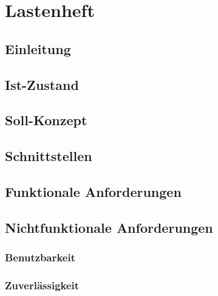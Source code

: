 \documentclass[a4paper,12pt]{article}
\title{\projektName}
\author{\authorName}
\date{\today}
\begin{document}
    
    \setcounter{page}{2}
    \setcounter{tocdepth}{4}
    \setcounter{secnumdepth}{4}
    \tableofcontents
    \clearpage
 
	\begin{abstract}
		Abstrakte Beschreibung.
	\end{abstract}	
	\clearpage
 
	\section{Lastenheft}
 	
		\subsection{Einleitung} %
 		
 		
		\subsection{Ist-Zustand} %
 		
 		
		\subsection{Soll-Konzept} %
 		
 		
		\subsection{Schnittstellen}
 		
 		
		\subsection{Funktionale Anforderungen}
 		
 		
		\subsection{Nichtfunktionale Anforderungen}
            \subsubsection{Benutzbarkeit}
            
            
            \subsubsection{Zuverlässigkeit}
            
            
\end{document}
